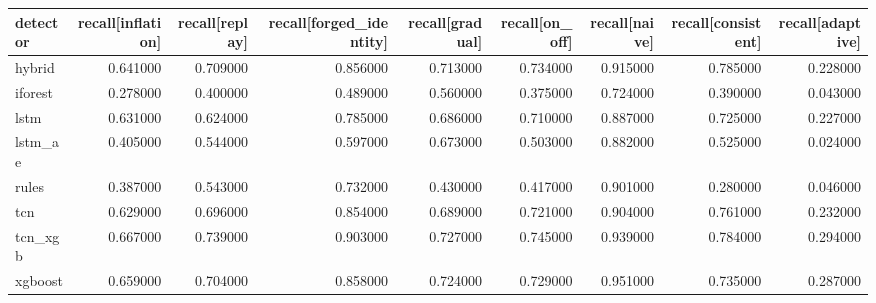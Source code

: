 \begin{tabular}{lrrrrrrrr}
\toprule
detector & recall[inflation] & recall[replay] & recall[forged\_identity] & recall[gradual] & recall[on\_off] & recall[naive] & recall[consistent] & recall[adaptive] \\
\midrule
hybrid & 0.641000 & 0.709000 & 0.856000 & 0.713000 & 0.734000 & 0.915000 & 0.785000 & 0.228000 \\
iforest & 0.278000 & 0.400000 & 0.489000 & 0.560000 & 0.375000 & 0.724000 & 0.390000 & 0.043000 \\
lstm & 0.631000 & 0.624000 & 0.785000 & 0.686000 & 0.710000 & 0.887000 & 0.725000 & 0.227000 \\
lstm\_ae & 0.405000 & 0.544000 & 0.597000 & 0.673000 & 0.503000 & 0.882000 & 0.525000 & 0.024000 \\
rules & 0.387000 & 0.543000 & 0.732000 & 0.430000 & 0.417000 & 0.901000 & 0.280000 & 0.046000 \\
tcn & 0.629000 & 0.696000 & 0.854000 & 0.689000 & 0.721000 & 0.904000 & 0.761000 & 0.232000 \\
tcn\_xgb & 0.667000 & 0.739000 & 0.903000 & 0.727000 & 0.745000 & 0.939000 & 0.784000 & 0.294000 \\
xgboost & 0.659000 & 0.704000 & 0.858000 & 0.724000 & 0.729000 & 0.951000 & 0.735000 & 0.287000 \\
\bottomrule
\end{tabular}
